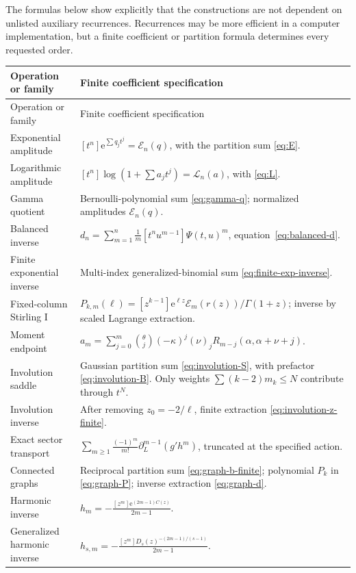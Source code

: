 \documentclass[11pt,a4paper]{article}
\numberwithin{equation}{section}
\theoremstyle{definition}
\theoremstyle{remark}
\newcommand{\ee}{\mathrm e}
\newcommand{\cE}{\mathcal E}
\newcommand{\cL}{\mathcal L}
\begin{document}
The formulas below show explicitly that the constructions are not dependent on unlisted auxiliary recurrences. Recurrences may be more efficient in a computer implementation, but a finite coefficient or partition formula determines every requested order.

\begin{longtable}{P{43mm}P{104mm}}
\toprule
Operation or family & Finite coefficient specification\\\midrule
\endfirsthead
\toprule
Operation or family & Finite coefficient specification\\\midrule
\endhead
Exponential amplitude &
$\displaystyle [t^n]\ee^{\sum q_jt^j}=\cE_n(q)$, with the partition sum \eqref{eq:E}.\\[3pt]
Logarithmic amplitude &
$\displaystyle [t^n]\log(1+\sum a_jt^j)=\cL_n(a)$, with \eqref{eq:L}.\\[3pt]
Gamma quotient &
Bernoulli-polynomial sum \eqref{eq:gamma-q}; normalized amplitudes $\cE_n(q)$.\\[3pt]
Balanced inverse &
$\displaystyle d_n=\sum_{m=1}^n\frac1m[t^nu^{m-1}]\Psi(t,u)^m$, equation~\eqref{eq:balanced-d}.\\[3pt]
Finite exponential inverse &
Multi-index generalized-binomial sum \eqref{eq:finite-exp-inverse}.\\[3pt]
Fixed-column Stirling I &
$\displaystyle P_{k,m}(\ell)=[z^{k-1}]\ee^{\ell z}\cE_m(r(z))/\Gamma(1+z)$; inverse by scaled Lagrange extraction.\\[3pt]
Moment endpoint &
$\displaystyle a_m=\sum_{j=0}^m\binom\theta j(-\kappa)^j(\nu)_jR_{m-j}(\alpha,\alpha+\nu+j)$.\\[3pt]
Involution saddle &
Gaussian partition sum \eqref{eq:involution-S}, with prefactor \eqref{eq:involution-B}. Only weights $\sum(k-2)m_k\le N$ contribute through $t^N$.\\[3pt]
Involution inverse &
After removing $z_0=-2/\ell$, finite extraction \eqref{eq:involution-z-finite}.\\[3pt]
Exact sector transport &
$\displaystyle \sum_{m\ge1}\frac{(-1)^m}{m!}\partial_L^{m-1}(g'h^m)$, truncated at the specified action.\\[3pt]
Connected graphs &
Reciprocal partition sum \eqref{eq:graph-b-finite}; polynomial $P_k$ in \eqref{eq:graph-P}; inverse extraction \eqref{eq:graph-d}.\\[3pt]
Harmonic inverse &
$\displaystyle h_m=-\frac{[z^m]\ee^{(2m-1)C(z)}}{2m-1}$.\\[3pt]
Generalized harmonic inverse &
$\displaystyle h_{s,m}=-\frac{[z^m]D_s(z)^{-(2m-1)/(s-1)}}{2m-1}$.\\
\bottomrule
\end{longtable}
\end{document}
